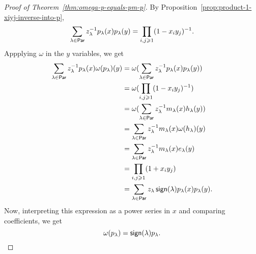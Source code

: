\begin{proof}[Proof of Theorem~\ref{thm:omega-p-equals-pm-p}]
	By Proposition~\ref{prop:product-1-xiyj-inverse-into-p},
	\begin{equation}
		\sum_{\lambda \in \operatorname{\mathsf{Par}}} z_\lambda^{-1} p_\lambda(x) p_\lambda(y)
		=
		\prod_{i, j \geqslant 1} (1 - x_iy_j)^{-1}.
	\end{equation}
	Appplying \(\omega\) in the \(y\) variables, we get
	\begin{align}
		\sum_{\lambda \in \operatorname{\mathsf{Par}}} z_\lambda^{-1} p_\lambda(x) \omega(p_\lambda)(y)
		&= \omega(\sum_{\lambda \in \operatorname{\mathsf{Par}}} z_\lambda^{-1} p_\lambda(x) p_\lambda(y)) \\
		&= \omega(\prod_{i, j \geqslant 1} (1 - x_iy_j)^{-1}) \\
		&= \omega(\sum_{\lambda \in \operatorname{\mathsf{Par}}} z_\lambda^{-1} m_\lambda(x) h_\lambda(y)) \\
		&= \sum_{\lambda \in \operatorname{\mathsf{Par}}} z_\lambda^{-1} m_\lambda(x) \omega(h_\lambda)(y) \\
		&= \sum_{\lambda \in \operatorname{\mathsf{Par}}} z_\lambda^{-1} m_\lambda(x) e_\lambda(y) \\
		&= \prod_{i, j \geqslant 1} (1 + x_iy_j) \\
		&= \sum_{\lambda \in \operatorname{\mathsf{Par}}} z_\lambda \operatorname{\mathsf{sign}}(\lambda) p_\lambda(x) p_\lambda(y).
	\end{align}
	Now, interpreting this expression as a power series in \(x\) and comparing coefficients, we get
	\begin{equation}
		\omega(p_\lambda) = \operatorname{\mathsf{sign}}(\lambda) p_\lambda. \qedhere
	\end{equation}
\end{proof}